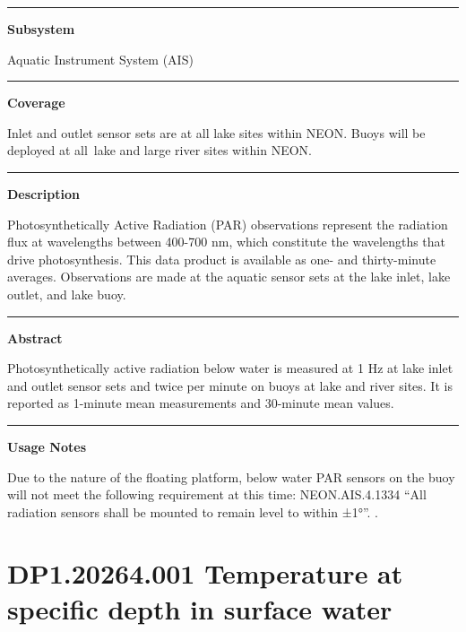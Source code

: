\documentclass[]{article}
\begin{document}
\begin{center}\rule{0.5\linewidth}{\linethickness}\end{center}

\textbf{Subsystem}

Aquatic Instrument System (AIS)

\begin{center}\rule{0.5\linewidth}{\linethickness}\end{center}

\textbf{Coverage}

Inlet and outlet sensor sets are at all lake sites within NEON. Buoys
will be deployed at all~lake and large river sites within NEON.

\begin{center}\rule{0.5\linewidth}{\linethickness}\end{center}

\textbf{Description}

Photosynthetically Active Radiation (PAR) observations represent the
radiation flux at wavelengths between 400-700 nm, which constitute the
wavelengths that drive photosynthesis. This data product is available as
one- and thirty-minute averages. Observations are made at the aquatic
sensor sets at the lake inlet, lake outlet, and lake buoy.

\begin{center}\rule{0.5\linewidth}{\linethickness}\end{center}

\textbf{Abstract}

Photosynthetically active radiation below water is measured at 1 Hz at
lake inlet and outlet sensor sets and twice per minute on buoys at lake
and river sites. It is reported as 1-minute mean measurements and
30-minute mean values.

\begin{center}\rule{0.5\linewidth}{\linethickness}\end{center}

\textbf{Usage Notes}

Due to the nature of the floating platform, below water PAR sensors on
the buoy will not meet the following requirement at this time:
NEON.AIS.4.1334 ``All radiation sensors shall be mounted to remain level
to within ±1°''. \newpage
.

\section{DP1.20264.001 Temperature at specific depth in surface
water}\label{dp1.20264.001-temperature-at-specific-depth-in-surface-water}
\end{document}
